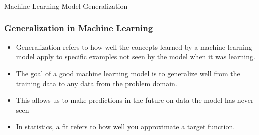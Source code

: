 \begin{frame}[fragile]\frametitle{}
\begin{center}
{\Large Machine Learning Model Generalization}
\end{center}
\end{frame}


\begin{frame}[fragile]\frametitle{Generalization in Machine Learning}
\begin{itemize}
\item Generalization refers to how well the concepts learned by a machine learning model apply to specific examples not seen by the model when it was learning.
\item The goal of a good machine learning model is to generalize well from the training data to any data from the problem domain. 
\item This allows us to make predictions in the future on data the model has never seen
\item In statistics, a fit refers to how well you approximate a target function.
\end{itemize}
\end{frame}



%



